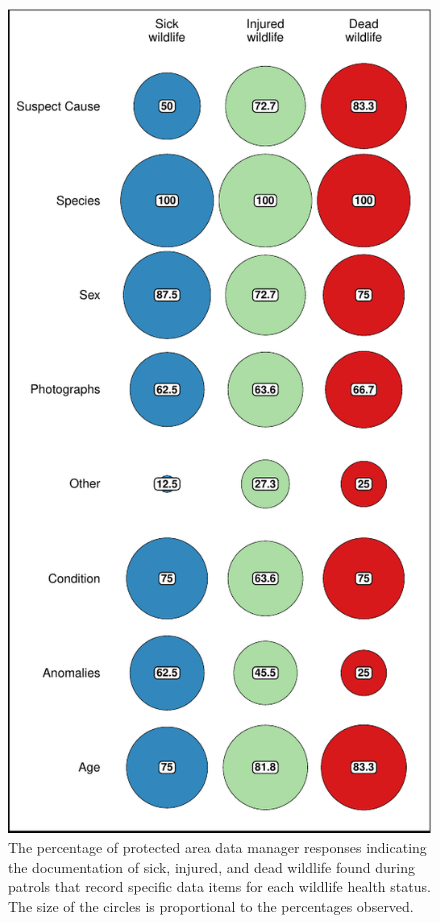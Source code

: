 \documentclass[
  letterpaper,
  DIV=11,
  numbers=noendperiod]{scrartcl}
\begin{document}
\begin{figure}[H]

{\centering \includegraphics{Appendix_final_files/figure-pdf/data items collected-1.pdf}

}

\caption{The percentage of protected area data manager responses
indicating the documentation of sick, injured, and dead wildlife found
during patrols that record specific data items for each wildlife health
status. The size of the circles is proportional to the percentages
observed.}

\end{figure}
\end{document}
